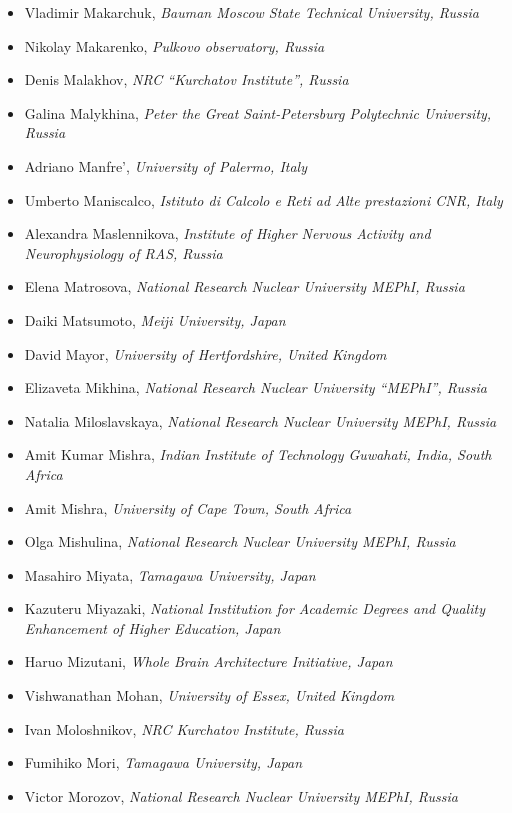 \documentclass[10pt,fleqn,openany]{book} %
\begin{document}
\begin{itemize}
		\item Vladimir Makarchuk, \textit{Bauman Moscow State Technical University, Russia}
		\item Nikolay Makarenko, \textit{Pulkovo observatory, Russia}
		\item Denis Malakhov, \textit{NRC ``Kurchatov Institute'', Russia}
		\item Galina Malykhina, \textit{Peter the Great Saint-Petersburg Polytechnic University, Russia}
		\item Adriano Manfre', \textit{University of Palermo, Italy}
		\item Umberto Maniscalco, \textit{Istituto di Calcolo e Reti ad Alte prestazioni CNR, Italy}
		\item Alexandra Maslennikova, \textit{Institute of Higher Nervous Activity and Neurophysiology of RAS, Russia}
		\item Elena Matrosova, \textit{National Research Nuclear University MEPhI, Russia}
		\item Daiki Matsumoto, \textit{Meiji University, Japan}
		\item David Mayor, \textit{University of Hertfordshire, United Kingdom}
		\item Elizaveta Mikhina, \textit{National Research Nuclear University ``MEPhI'', Russia}
		\item Natalia Miloslavskaya, \textit{National Research Nuclear University MEPhI, Russia}
		\item Amit Kumar Mishra, \textit{Indian Institute of Technology Guwahati, India, South Africa}
		\item Amit Mishra, \textit{University of Cape Town, South Africa}
		\item Olga Mishulina, \textit{National Research Nuclear University MEPhI, Russia}
		\item Masahiro Miyata, \textit{Tamagawa University, Japan}
		\item Kazuteru Miyazaki, \textit{National Institution for Academic Degrees and Quality Enhancement of Higher Education, Japan}
		\item Haruo Mizutani, \textit{Whole Brain Architecture Initiative, Japan}
		\item Vishwanathan Mohan, \textit{University of Essex, United Kingdom}
		\item Ivan Moloshnikov, \textit{NRC Kurchatov Institute, Russia}
		\item Fumihiko Mori, \textit{Tamagawa University, Japan}
		\item Victor Morozov, \textit{National Research Nuclear University MEPhI, Russia}

\end{itemize}
\end{document}
